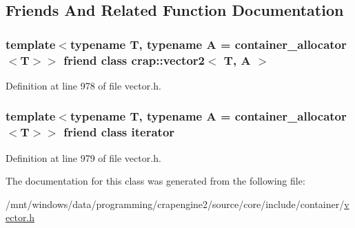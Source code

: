 \subsection{Friends And Related Function Documentation}
\hypertarget{classcrap_1_1vector2_1_1const__iterator_a142d8169185e0b8e0853b453e03d366f}{
\subsubsection[{crap\+::vector2$<$ T, A $>$}]{\setlength{\rightskip}{0pt plus 5cm}template$<$typename T, typename A = container\+\_\+allocator$<$\+T$>$$>$ friend class {\bf crap\+::vector2}$<$ T, A $>$\hspace{0.3cm}{\ttfamily [friend]}}}\label{classcrap_1_1vector2_1_1const__iterator_a142d8169185e0b8e0853b453e03d366f}


Definition at line 978 of file vector.\+h.

\hypertarget{classcrap_1_1vector2_1_1const__iterator_a67171474c4da6cc8efe0c7fafefd2b2d}{
\subsubsection[{iterator}]{\setlength{\rightskip}{0pt plus 5cm}template$<$typename T, typename A = container\+\_\+allocator$<$\+T$>$$>$ friend class {\bf iterator}\hspace{0.3cm}{\ttfamily [friend]}}}\label{classcrap_1_1vector2_1_1const__iterator_a67171474c4da6cc8efe0c7fafefd2b2d}


Definition at line 979 of file vector.\+h.



The documentation for this class was generated from the following file\+:\begin{DoxyCompactItemize}
\item 
/mnt/windows/data/programming/crapengine2/source/core/include/container/\hyperlink{vector_8h}{vector.\+h}\end{DoxyCompactItemize}

